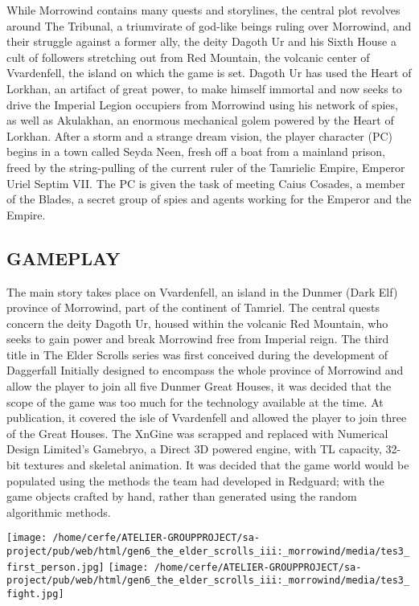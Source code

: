 \documentclass[a4paper,10pt]{book}
\begin{document}
          While Morrowind contains many quests and storylines, the central plot revolves around The Tribunal, a triumvirate of god-like beings ruling over Morrowind, and their struggle against a former ally, the deity Dagoth Ur and his Sixth House  a cult of followers stretching out from Red Mountain, the volcanic center of Vvardenfell, the island on which the game is set. Dagoth Ur has used the Heart of Lorkhan, an artifact of great power, to make himself immortal and now seeks to drive the Imperial Legion occupiers from Morrowind using his network of spies, as well as Akulakhan, an enormous mechanical golem powered by the Heart of Lorkhan.
          After a storm and a strange dream vision, the player character (PC) begins in a town called Seyda Neen, fresh off a boat from a mainland prison, freed by the string-pulling of the current ruler of the Tamrielic Empire, Emperor Uriel Septim VII. The PC is given the task of meeting Caius Cosades, a member of the Blades, a secret group of spies and agents working for the Emperor and the Empire.
         
 
 \subsection{ GAMEPLAY }
 
          The main story takes place on Vvardenfell, an island in the Dunmer (Dark Elf) province of Morrowind, part of the continent of Tamriel. The central quests concern the deity Dagoth Ur, housed within the volcanic Red Mountain, who seeks to gain power and break Morrowind free from Imperial reign.
          The third title in The Elder Scrolls series was first conceived during the development of Daggerfall Initially designed to encompass the whole province of Morrowind and allow the player to join all five Dunmer Great Houses, it was decided that the scope of the game was too much for the technology available at the time. At publication, it covered the isle of Vvardenfell and allowed the player to join three of the Great Houses. The XnGine was scrapped and replaced with Numerical Design Limited's Gamebryo, a Direct 3D powered engine, with TL capacity, 32-bit textures and skeletal animation. It was decided that the game world would be populated using the methods the team had developed in Redguard; with the game objects crafted by hand, rather than generated using the random algorithmic methods.
         
 \texttt{[image: /home/cerfe/ATELIER-GROUPPROJECT/sa-project/pub/web/html/gen6\_the\_elder\_scrolls\_iii:\_morrowind/media/tes3\_first\_person.jpg]}
 \texttt{[image: /home/cerfe/ATELIER-GROUPPROJECT/sa-project/pub/web/html/gen6\_the\_elder\_scrolls\_iii:\_morrowind/media/tes3\_fight.jpg]}
 
\end{document}
